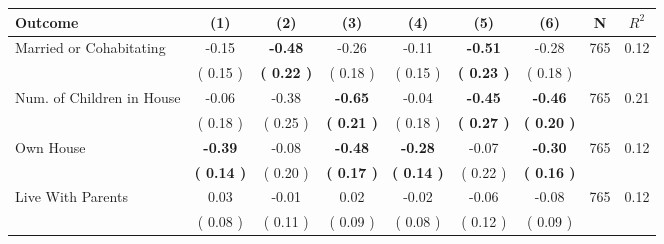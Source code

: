 \begin{tabular}{lcccccccc}
\toprule
 \textbf{Outcome} & \textbf{(1)} & \textbf{(2)} & \textbf{(3)} & \textbf{(4)} & \textbf{(5)} & \textbf{(6)} & \textbf{N} & \textbf{$ R^2$} \\
\midrule
Married or Cohabitating &     -0.15 & \textbf{    -0.48} &     -0.26 &     -0.11 & \textbf{    -0.51} &     -0.28 & 765 &       0.12 \\ 
 & (     0.15 ) & \textbf{(     0.22 )} & (     0.18 ) & (     0.15 ) & \textbf{(     0.23 )} & (     0.18 ) & \\
Num. of Children in House &     -0.06 &     -0.38 & \textbf{    -0.65} &     -0.04 & \textbf{    -0.45} & \textbf{    -0.46} & 765 &       0.21 \\ 
 & (     0.18 ) & (     0.25 ) & \textbf{(     0.21 )} & (     0.18 ) & \textbf{(     0.27 )} & \textbf{(     0.20 )} & \\
Own House & \textbf{    -0.39} &     -0.08 & \textbf{    -0.48} & \textbf{    -0.28} &     -0.07 & \textbf{    -0.30} & 765 &       0.12 \\ 
 & \textbf{(     0.14 )} & (     0.20 ) & \textbf{(     0.17 )} & \textbf{(     0.14 )} & (     0.22 ) & \textbf{(     0.16 )} & \\
Live With Parents &      0.03 &     -0.01 &      0.02 &     -0.02 &     -0.06 &     -0.08 & 765 &       0.12 \\ 
 & (     0.08 ) & (     0.11 ) & (     0.09 ) & (     0.08 ) & (     0.12 ) & (     0.09 ) & \\
\bottomrule
\end{tabular}
